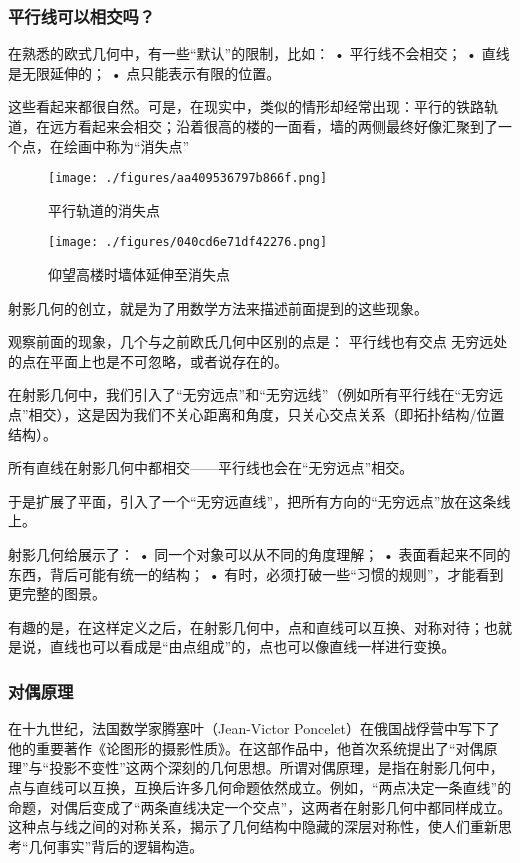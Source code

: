 \subsubsection{平行线可以相交吗？}

在熟悉的欧式几何中，有一些“默认”的限制，比如：
	•	平行线不会相交；
	•	直线是无限延伸的；
	•	点只能表示有限的位置。

这些看起来都很自然。可是，在现实中，类似的情形却经常出现：平行的铁路轨道，在远方看起来会相交；沿着很高的楼的一面看，墙的两侧最终好像汇聚到了一个点，在绘画中称为“消失点”

\begin{figure}[ht]
\centering
\texttt{[image: ./figures/aa409536797b866f.png]}
\caption{平行轨道的消失点} \label{fig_HsCsFD_2}
\end{figure}

\begin{figure}[ht]
\centering
\texttt{[image: ./figures/040cd6e71df42276.png]}
\caption{仰望高楼时墙体延伸至消失点} \label{fig_HsCsFD_3}
\end{figure}
射影几何的创立，就是为了用数学方法来描述前面提到的这些现象。

观察前面的现象，几个与之前欧氏几何中区别的点是：
平行线也有交点
无穷远处的点在平面上也是不可忽略，或者说存在的。

在射影几何中，我们引入了“无穷远点”和“无穷远线”（例如所有平行线在“无穷远点”相交），这是因为我们不关心距离和角度，只关心交点关系（即拓扑结构/位置结构）。

所有直线在射影几何中都相交——平行线也会在“无穷远点”相交。

于是扩展了平面，引入了一个“无穷远直线”，把所有方向的“无穷远点”放在这条线上。

射影几何给展示了：
	•	同一个对象可以从不同的角度理解；
	•	表面看起来不同的东西，背后可能有统一的结构；
	•	有时，必须打破一些“习惯的规则”，才能看到更完整的图景。

有趣的是，在这样定义之后，在射影几何中，点和直线可以互换、对称对待；也就是说，直线也可以看成是“由点组成”的，点也可以像直线一样进行变换。


\subsubsection{对偶原理}

在十九世纪，法国数学家腾塞叶（Jean-Victor Poncelet）在俄国战俘营中写下了他的重要著作《论图形的摄影性质》。在这部作品中，他首次系统提出了“对偶原理”与“投影不变性”这两个深刻的几何思想。所谓对偶原理，是指在射影几何中，点与直线可以互换，互换后许多几何命题依然成立。例如，“两点决定一条直线”的命题，对偶后变成了“两条直线决定一个交点”，这两者在射影几何中都同样成立。这种点与线之间的对称关系，揭示了几何结构中隐藏的深层对称性，使人们重新思考“几何事实”背后的逻辑构造。

